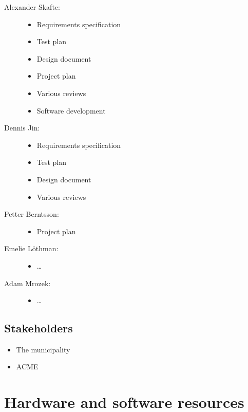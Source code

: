 \documentclass[12pt,titlepage]{article}
\begin{document}
\begin{description}
	\item[Alexander Skafte:] \hfill
		\begin{itemize}
			\item Requirements specification
			\item Test plan
			\item Design document
			\item Project plan
			\item Various reviews
			\item Software development
		\end{itemize}
	\item[Dennis Jin:] \hfill
		\begin{itemize}
			\item Requirements specification
			\item Test plan
			\item Design document
			\item Various reviews
		\end{itemize}
	\item[Petter Berntsson:] \hfill
		\begin{itemize}
			\item Project plan
		\end{itemize}
	\item[Emelie Löthman:] \hfill
		\begin{itemize}
			\item \ldots
		\end{itemize}
	\item[Adam Mrozek:] \hfill
		\begin{itemize}
			\item \ldots
		\end{itemize}
\end{description}

\subsection{Stakeholders}

\begin{itemize}
	\item The municipality
	\item ACME
\end{itemize}


\section{Hardware and software resources}
\label{sec:hardware-and-software-resources}
\end{document}
